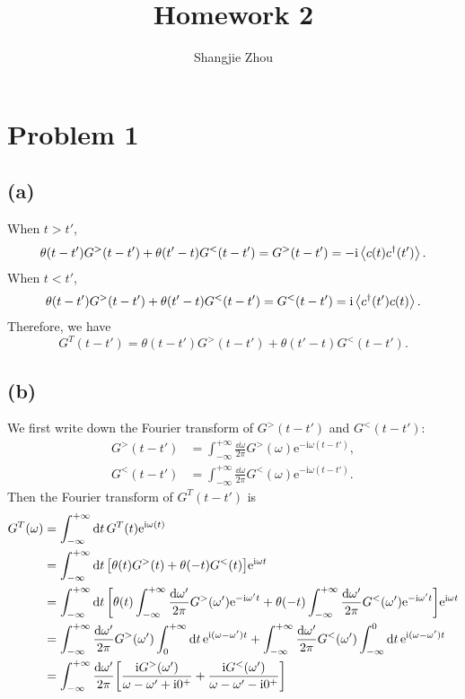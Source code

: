 \documentclass{article}
\title{Homework 2}
\author{Shangjie Zhou}
\newcommand{\ii}{\mathrm{i}}
\newcommand{\me}{\mathrm{e}}
\begin{document}
\maketitle


\section*{Problem 1}
\subsection*{(a)}
When $t>t'$,
\begin{equation}
    \theta(t-t')G^{>}(t-t')+\theta(t'-t)G^{<}(t-t')=G^{>}(t-t')=-\ii\expval{c(t)c^{\dagger}(t')}.
\end{equation}
When $t<t'$,
\begin{equation}
    \theta(t-t')G^{>}(t-t')+\theta(t'-t)G^{<}(t-t')=G^{<}(t-t')=\ii\expval{c^{\dagger}(t')c(t)}.
\end{equation}
Therefore, we have 
\begin{equation}
    G^{T}(t-t')=\theta(t-t')G^{>}(t-t')+\theta(t'-t)G^{<}(t-t').
\end{equation}

\subsection*{(b)}
We first write down the Fourier transform of $G^{>}(t-t')$ and $G^{<}(t-t')$:
\begin{subequations}
    \begin{align}
        G^{>}(t-t')&=\int_{-\infty}^{+\infty}\frac{\dd{\omega}}{2\pi}G^{>}(\omega)\me^{-\ii\omega(t-t')},\\
        G^{<}(t-t')&=\int_{-\infty}^{+\infty}\frac{\dd{\omega}}{2\pi}G^{<}(\omega)\me^{-\ii\omega(t-t')}.
    \end{align}
\end{subequations}
Then the Fourier transform of $G^{T}(t-t')$ is
\begin{equation}
    \begin{split}
        G^{T}(\omega)&=\int_{-\infty}^{+\infty}\dd{t}G^{T}(t)\me^{\ii\omega(t)}\\
        &=\int_{-\infty}^{+\infty}\dd{t}\qty[\theta(t)G^{>}(t)+\theta(-t)G^{<}(t)]\me^{\ii\omega t}\\
        &=\int_{-\infty}^{+\infty}\dd{t}\qty[\theta(t)\int_{-\infty}^{+\infty}\frac{\dd{\omega'}}{2\pi}G^{>}(\omega')\me^{-\ii\omega' t}+\theta(-t)\int_{-\infty}^{+\infty}\frac{\dd{\omega'}}{2\pi}G^{<}(\omega')\me^{-\ii\omega' t}]\me^{\ii\omega t}\\
        &=\int_{-\infty}^{+\infty}\frac{\dd{\omega'}}{2\pi}G^{>}(\omega')\int_{0}^{+\infty}\dd{t}\me^{\ii(\omega-\omega')t}+\int_{-\infty}^{+\infty}\frac{\dd{\omega'}}{2\pi}G^{<}(\omega')\int_{-\infty}^{0}\dd{t}\me^{\ii(\omega-\omega')t}\\
        &=\int_{-\infty}^{+\infty}\frac{\dd{\omega'}}{2\pi}\qty[\frac{\ii G^{>}(\omega')}{\omega-\omega'+\ii0^{+}}+\frac{\ii G^{<}(\omega')}{\omega-\omega'-\ii0^{+}}]
    \end{split}
\end{equation}
\end{document}

